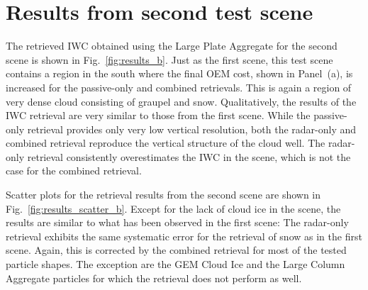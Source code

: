 \documentclass[journal abbreviation, manuscript]{copernicus}
\begin{document}



\clearpage
\appendix


\section{Results from second test scene}
\label{app:results_b}

The retrieved IWC obtained using the Large Plate Aggregate for the second scene
is shown in Fig.~\ref{fig:results_b}. Just as the first scene, this test scene
contains a region in the south where the final OEM cost, shown in Panel~(a), is
increased for the passive-only and combined retrievals. This is again a region
of very dense cloud consisting of graupel and snow. Qualitatively, the results
of the IWC retrieval are very similar to those from the first scene. While the
passive-only retrieval provides only very low vertical resolution, both the
radar-only and combined retrieval reproduce the vertical structure of the cloud
well. The radar-only retrieval consistently overestimates the IWC in the scene,
which is not the case for the combined retrieval.

Scatter plots for the retrieval results from the second scene are shown in
Fig.~\ref{fig:results_scatter_b}. Except for the lack of cloud ice in the scene,
the results are similar to what has been observed in the first scene: The
radar-only retrieval exhibits the same systematic error for the retrieval of snow as in
the first scene. Again, this is corrected by the combined retrieval for most of
the tested particle shapes. The exception are the GEM Cloud Ice and the Large
Column Aggregate particles for which the retrieval does not perform as well.
\end{document}
